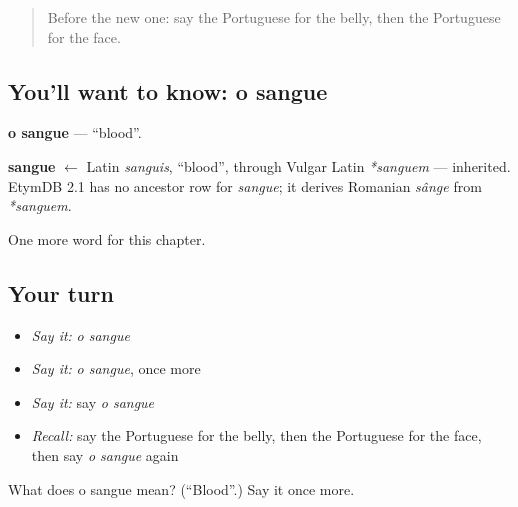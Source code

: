 \begin{quote}
Before the new one: say the Portuguese for the belly, then the Portuguese for the face.
\end{quote}

\subsection*{You'll want to know: o sangue}
\textbf{o sangue} — \textquotedblleft{}blood\textquotedblright{}.

\begin{cousinweb}
\textbf{sangue} $\leftarrow$ Latin \emph{sanguis}, \textquotedblleft{}blood\textquotedblright{}, through Vulgar Latin \emph{*sanguem} — inherited. EtymDB 2.1 has no ancestor row for \emph{sangue}; it derives Romanian \emph{sânge} from \emph{*sanguem}.
\end{cousinweb}

\begin{grammarlens}[title={What you've built}]
One more word for this chapter.
\end{grammarlens}

\subsection*{Your turn}
\begin{itemize}
\raggedright
  \item \emph{Say it:} \emph{o sangue}
  \item \emph{Say it:} \emph{o sangue}, once more
  \item \emph{Say it:} say \emph{o sangue}
  \item \emph{Recall:} say the Portuguese for the belly, then the Portuguese for the face, then say \emph{o sangue} again
\end{itemize}

\begin{tcolorbox}[breakable,colback=teal!4,colframe=teal!35!black,title={Before you move on}]
What does o sangue mean? (\textquotedblleft{}Blood\textquotedblright{}.) Say it once more.
\end{tcolorbox}
